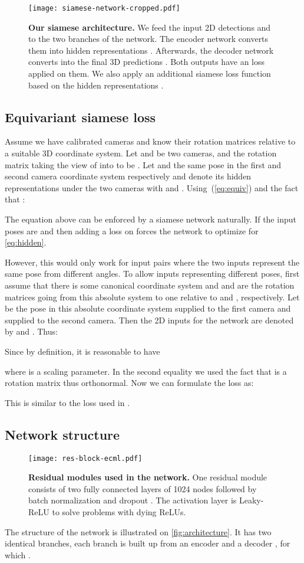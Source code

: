 \documentclass[preprint]{elsarticle}
\begin{document}
\begin{figure}[ht]
    \centering
    \texttt{[image: siamese-network-cropped.pdf]}
    \caption{\textbf{Our siamese architecture.} We feed the input 2D detections  and  to the two branches of the network. The encoder network  converts them into hidden representations . Afterwards, the decoder network  converts  into the final 3D predictions . Both outputs have an  loss applied on them. We also apply an additional siamese loss function  based on the hidden representations .}
    \label{fig:architecture}
\end{figure}

\subsection{Equivariant siamese loss}
Assume we have calibrated cameras and know their rotation matrices relative to a suitable 3D coordinate system. Let  and  be two cameras, and the rotation matrix taking the view of  into  to be . Let  and  the same pose in the first and second camera coordinate system respectively and denote its hidden representations under the two cameras with  and . Using~(\ref{eq:equiv}) and the fact that :


The equation above can be enforced by a siamese network naturally. If the input poses are  and  then adding a loss on  forces the network to optimize for \autoref{eq:hidden}. 

However, this would only work for input pairs where the two inputs represent the same pose from different angles. To allow inputs representing different poses, first assume that there is some canonical coordinate system and  and  are the rotation matrices going from this absolute system to one relative to  and , respectively. Let  be the pose in this absolute coordinate system supplied to the first camera and  supplied to the second camera. Then the 2D inputs for the network are denoted by  and . Thus:

Since  by definition,  it is reasonable to have 

where  is a scaling parameter. In the second equality we used the fact that  is a rotation matrix thus orthonormal. Now we can formulate the loss as:

This is similar to the loss used in \cite{doumanoglouSiamesePose,siamese_headpose}.


\subsection{Network structure}
\begin{figure}[ht]
    \centering
    \texttt{[image: res-block-ecml.pdf]}
    \caption{\textbf{Residual modules used in the network.} One residual module consists of two fully connected layers of 1024 nodes followed by batch normalization \cite{batchnorm} and dropout \cite{dropout}. The activation layer is Leaky-ReLU to solve problems with dying ReLUs.}
    \label{fig:res-block}
\end{figure}
The structure of the network is illustrated on \autoref{fig:architecture}. It has two identical branches, each branch is built up from an encoder  and a decoder , for which .
\end{document}
